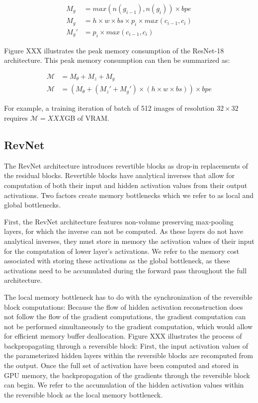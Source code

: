 \documentclass[twocolumn]{bmcart}
\begin{document}
\begin{subequations}
\begin{align}
M_{g}  &= max(n(g_{i-1}), n(g_i)) \times bpe \\
M_{g}  &= h \times w \times bs \times p_i \times max(c_{i-1}, c_i) \\ 
M_{g}' &= p_i \times max(c_{i-1}, c_i)
\end{align}
\end{subequations}

Figure XXX illustrates the peak memory consumption of the ResNet-18 architecture.
This peak memory consumption can then be summarized as:

\begin{subequations}
\begin{align}
\mathcal{M} &= M_{\theta} + M_{z} + M_{g} \\
\mathcal{M} &= (M_{\theta} + (M_{z}' + M_{g}') \times (h \times w \times bs)) \times bpe
\end{align}
\end{subequations}

For example, a training iteration of batch of 512 images of resolution $32 \times 32$ requires $\mathcal{M}=XXX$GB of VRAM.

\subsection{RevNet}
The RevNet architecture introduces revertible blocks as drop-in replacements of the residual blocks. 
Revertible blocks have analytical inverses that allow for computation of both their input and hidden activation values from their output activations. 
Two factors create memory bottlenecks which we refer to as local and global bottlenecks.

First, the RevNet architecture features non-volume preserving max-pooling layers, for which the inverse can not be computed. 
As these layers do not have analytical inverses, they must store in memory the activation values of their input for the computation of lower layer's activations. 
We refer to the memory cost associated with storing these activations as the global bottleneck, as these activations need to be accumulated during the forward pass throughout the full architecture.

The local memory bottleneck has to do with the synchronization of the reversible block computations:
Because the flow of hidden activation reconstruction does not follow the flow of the gradient computations, 
the gradient computation can not be performed simultaneously to the gradient computation, 
which would allow for efficient memory buffer deallocation.
Figure XXX illustrates the process of backpropagating through a reversible block:
First, the input activation values of the parameterized hidden layers within the reversible blocks are recomputed from the output.
Once the full set of activation have been computed and stored in GPU memory, the backpropagation of the gradients through the reversible block can begin. 
We refer to the accumulation of the hidden activation values within the reversible block as the local memory bottleneck.
\end{document}
